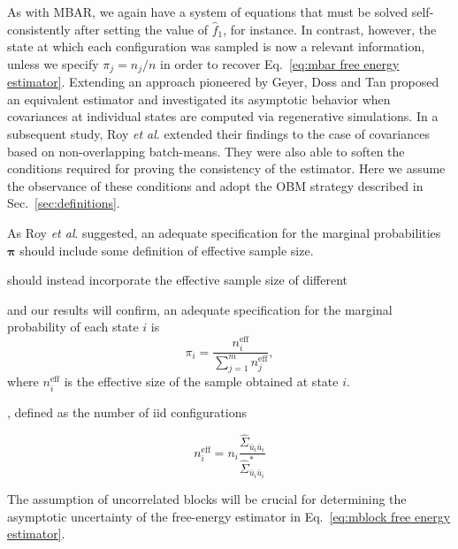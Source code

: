 \documentclass[aip,jcp,reprint,amsmath,amssymb]{revtex4-1}
\newcommand{\mt}[1]{\boldsymbol{\mathbf{#1}}}           %
\newcommand{\vt}[1]{\boldsymbol{\mathbf{#1}}}           %
\begin{document}
As with MBAR, we again have a system of equations that must be solved self-consistently after setting the value of $\hat f_1$, for instance. In contrast, however, the state at which each configuration was sampled is now a relevant information, unless we specify $\pi_j = {n_j}/{n}$ in order to recover Eq.~\eqref{eq:mbar free energy estimator}. Extending an approach pioneered by Geyer,\cite{Geyer_1994} Doss and Tan\cite{Doss_2014} proposed an equivalent estimator and investigated its asymptotic behavior when covariances at individual states are computed via regenerative simulations. In a subsequent study, Roy \textit{et al}.\cite{Roy_2018} extended their findings to the case of covariances based on non-overlapping batch-means. They were also able to soften the conditions required for proving the consistency of the estimator. Here we assume the observance of these conditions and adopt the OBM strategy described in Sec.~\ref{sec:definitions}.

As Roy \textit{et al}.\cite{Roy_2018} suggested, an adequate specification for the marginal probabilities $\vt \pi$ should include some definition of effective sample size.


should instead incorporate the effective sample size of different 

 and our results will confirm, an adequate specification for the marginal probability of each state $i$ is
\begin{equation}
\label{eq:mblock prior}
\pi_i = \frac{n^\text{eff}_i}{\sum_{j=1}^m n^\text{eff}_j},
\end{equation}
where $n^\text{eff}_i$ is the effective size of the sample obtained at state $i$.

, defined as the number of iid configurations 

\begin{equation*}
n^\text{eff}_i = n_i \frac{\hat{\Sigma}_{\bar u_i \bar u_i}}{\hat{\Sigma}^\ast_{\bar u_i \bar u_i}}
\end{equation*}

The assumption of uncorrelated blocks will be crucial for determining the asymptotic uncertainty of the free-energy estimator in Eq.~\eqref{eq:mblock free energy estimator}.
\end{document}
